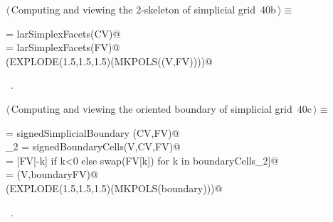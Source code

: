 \documentclass[11pt,oneside]{article}	%
\begin{document}
\begin{flushleft} \small \label{scrap81}
\protect{}$\langle\,$Computing and viewing the 2-skeleton of simplicial grid\nobreak\ {\footnotesize 40b}$\,\rangle\equiv$
\vspace{-1ex}
\begin{list}{}{} \item
\mbox{}\verb@FV = larSimplexFacets(CV)@\\
\mbox{}\verb@EV = larSimplexFacets(FV)@\\
\mbox{}\verb@VIEW(EXPLODE(1.5,1.5,1.5)(MKPOLS((V,FV))))@\\
\mbox{}\verb@@{\NWsep}
\end{list}
\vspace{-1ex}
\footnotesize\addtolength{\baselineskip}{-1ex}
\begin{list}{}{\setlength{\itemsep}{-\parsep}\setlength{\itemindent}{-\leftmargin}}
\item \NWtxtMacroRefIn\ .
\end{list}
\end{flushleft}

\begin{flushleft} \small \label{scrap82}
\protect{}$\langle\,$Computing and viewing the oriented boundary of simplicial grid\nobreak\ {\footnotesize 40c}$\,\rangle\equiv$
\vspace{-1ex}
\begin{list}{}{} \item
\mbox{}\verb@csrSignedBoundaryMat = signedSimplicialBoundary (CV,FV)@\\
\mbox{}\verb@boundaryCells_2 = signedBoundaryCells(V,CV,FV)@\\
\mbox{}\verb@boundaryFV = [FV[-k] if k<0 else swap(FV[k]) for k in boundaryCells_2]@\\
\mbox{}\verb@boundary = (V,boundaryFV)@\\
\mbox{}\verb@VIEW(EXPLODE(1.5,1.5,1.5)(MKPOLS(boundary)))@\\
\mbox{}\verb@@{\NWsep}
\end{list}
\vspace{-1ex}
\footnotesize\addtolength{\baselineskip}{-1ex}
\begin{list}{}{\setlength{\itemsep}{-\parsep}\setlength{\itemindent}{-\leftmargin}}
\item \NWtxtMacroRefIn\ .
\end{list}
\end{flushleft}
\end{document}
